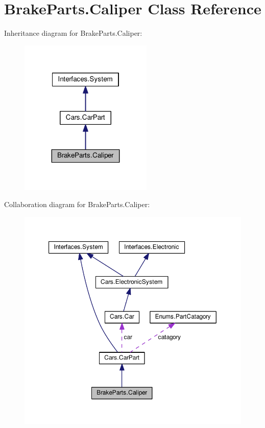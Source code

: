\hypertarget{classBrakeParts_1_1Caliper}{}\section{Brake\+Parts.\+Caliper Class Reference}
\label{classBrakeParts_1_1Caliper}


Inheritance diagram for Brake\+Parts.\+Caliper\+:\nopagebreak
\begin{figure}[H]
\begin{center}
\leavevmode
\includegraphics[width=179pt]{classBrakeParts_1_1Caliper__inherit__graph}
\end{center}
\end{figure}


Collaboration diagram for Brake\+Parts.\+Caliper\+:\nopagebreak
\begin{figure}[H]
\begin{center}
\leavevmode
\includegraphics[width=350pt]{classBrakeParts_1_1Caliper__coll__graph}
\end{center}
\end{figure}
